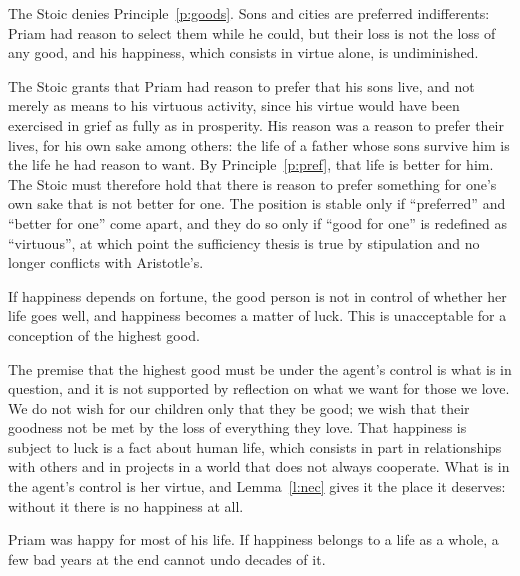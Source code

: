 \documentclass{situationist-preprint}
\begin{document}
\begin{objection}[Indifferents]\label{o:indiff}
The Stoic denies Principle~\ref{p:goods}. Sons and cities are preferred indifferents: Priam had reason to select them while he could, but their loss is not the loss of any good, and his happiness, which consists in virtue alone, is undiminished.
\end{objection}

\begin{reply}
The Stoic grants that Priam had reason to prefer that his sons live, and not merely as means to his virtuous activity, since his virtue would have been exercised in grief as fully as in prosperity. His reason was a reason to prefer their lives, for his own sake among others: the life of a father whose sons survive him is the life he had reason to want. By Principle~\ref{p:pref}, that life is better for him. The Stoic must therefore hold that there is reason to prefer something for one's own sake that is not better for one. The position is stable only if \enquote{preferred} and \enquote{better for one} come apart, and they do so only if \enquote{good for one} is redefined as \enquote{virtuous}, at which point the sufficiency thesis is true by stipulation and no longer conflicts with Aristotle's.
\end{reply}

\begin{objection}[Control]\label{o:control}
If happiness depends on fortune, the good person is not in control of whether her life goes well, and happiness becomes a matter of luck. This is unacceptable for a conception of the highest good.
\end{objection}

\begin{reply}
The premise that the highest good must be under the agent's control is what is in question, and it is not supported by reflection on what we want for those we love. We do not wish for our children only that they be good; we wish that their goodness not be met by the loss of everything they love. That happiness is subject to luck is a fact about human life, which consists in part in relationships with others and in projects in a world that does not always cooperate. What is in the agent's control is her virtue, and Lemma~\ref{l:nec} gives it the place it deserves: without it there is no happiness at all.
\end{reply}

\begin{objection}\label{o:whole}
Priam was happy for most of his life. If happiness belongs to a life as a whole, a few bad years at the end cannot undo decades of it.
\end{objection}
\end{document}
